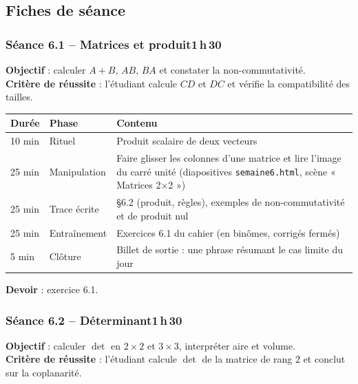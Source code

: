 \documentclass[10.5pt,a4paper]{article}
\newif\ifprof
\newcommand{\profonly}[1]{\ifprof #1\fi}
\begin{document}
\subsection{Fiches de séance}
\subsubsection*{\textcolor{marine}{Séance 6.1 -- Matrices et produit}\hfill\normalfont\small\textcolor{ardoise}{1\,h\,30}}
\begin{objectif}\textbf{Objectif} : calculer $A+B$, $AB$, $BA$ et constater la non-commutativité.\\\textbf{Critère de réussite} : l'étudiant calcule $CD$ et $DC$ et vérifie la compatibilité des tailles.\end{objectif}\nopagebreak
\begin{longtable}{@{}p{1.1cm}p{2.4cm}p{12.4cm}@{}}
\toprule \textbf{Durée} & \textbf{Phase} & \textbf{Contenu}\\ \midrule\endhead
10 min & Rituel & Produit scalaire de deux vecteurs\\
25 min & Manipulation & Faire glisser les colonnes d'une matrice et lire l'image du carré unité (diapositives \texttt{semaine6.html}, scène « Matrices 2×2 »)\\
25 min & Trace écrite & \S6.2 (produit, règles), exemples de non-commutativité et de produit nul\\
25 min & Entraînement & Exercices 6.1 du cahier (en binômes, corrigés fermés)\\
5 min & Clôture & Billet de sortie : une phrase résumant le cas limite du jour\\ \bottomrule\end{longtable}\nopagebreak
\textbf{Devoir} : exercice 6.1.\profonly{ \textbf{Point de vigilance} : Surveiller le produit terme à terme, fréquent.}\par
{}\subsubsection*{\textcolor{marine}{Séance 6.2 -- Déterminant}\hfill\normalfont\small\textcolor{ardoise}{1\,h\,30}}
\begin{objectif}\textbf{Objectif} : calculer $\det$ en $2\times2$ et $3\times3$, interpréter aire et volume.\\\textbf{Critère de réussite} : l'étudiant calcule $\det$ de la matrice de rang $2$ et conclut sur la coplanarité.\end{objectif}\nopagebreak
\end{document}
